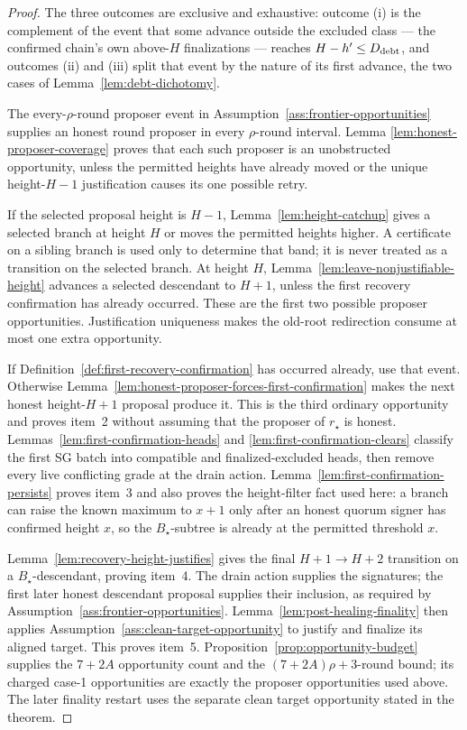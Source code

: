 \begin{proof}
The three outcomes are exclusive and exhaustive: outcome (i) is the
complement of the event that some advance outside the excluded class
--- the confirmed chain's own above-\(H\) finalizations --- reaches
\(H-h'\leq D_{\rm debt}\), and outcomes (ii) and (iii) split that
event by the nature of its first advance, the two cases of
Lemma~\ref{lem:debt-dichotomy}.

The every-\(\rho\)-round proposer event in
Assumption~\ref{ass:frontier-opportunities} supplies an honest round proposer
in every \(\rho\)-round interval.  Lemma
\ref{lem:honest-proposer-coverage} proves that each such proposer is an
unobstructed opportunity, unless the permitted heights have already moved or the
unique height-\(H-1\) justification causes its one possible retry.

If the selected proposal height is \(H-1\),
Lemma~\ref{lem:height-catchup} gives a selected branch at height \(H\) or
moves the permitted heights higher.  A certificate on a sibling branch is used
only to determine that band; it is never treated as a transition on the
selected branch.  At height \(H\),
Lemma~\ref{lem:leave-nonjustifiable-height} advances a selected descendant to
\(H+1\), unless the first recovery confirmation has already occurred.  These
are the first two possible proposer opportunities.  Justification uniqueness
makes the old-root redirection consume at most one extra opportunity.

If Definition~\ref{def:first-recovery-confirmation} has occurred already,
use that event.  Otherwise
Lemma~\ref{lem:honest-proposer-forces-first-confirmation} makes the next
honest height-\(H+1\) proposal produce it.  This is the third ordinary
opportunity and proves item~2 without assuming that
the proposer of \(r_\star\) is honest.
Lemmas~\ref{lem:first-confirmation-heads} and
\ref{lem:first-confirmation-clears} classify the first SG batch into
compatible and finalized-excluded heads, then remove every live conflicting
grade at the drain action.
Lemma~\ref{lem:first-confirmation-persists} proves item~3 and also proves the
height-filter fact used here: a branch can raise the known maximum to
\(x+1\) only after an honest quorum signer has confirmed height \(x\), so
the \(B_\star\)-subtree is already at the permitted threshold \(x\).

Lemma~\ref{lem:recovery-height-justifies} gives the final
\(H+1\to H+2\) transition on a \(B_\star\)-descendant, proving item~4.
The drain action supplies the signatures; the first later honest descendant
proposal supplies their inclusion, as required by
Assumption~\ref{ass:frontier-opportunities}.
Lemma~\ref{lem:post-healing-finality} then applies
Assumption~\ref{ass:clean-target-opportunity} to justify and finalize its
aligned target.  This proves item~5.
Proposition~\ref{prop:opportunity-budget} supplies the \(7+2A\)
opportunity count and the \((7+2A)\rho+3\)-round bound; its charged
case-1 opportunities are exactly the proposer opportunities used above.
The later finality restart uses the separate clean target opportunity
stated in the theorem.
\end{proof}

